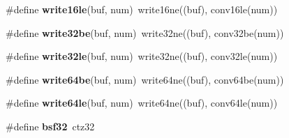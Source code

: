 \begin{DoxyCompactItemize}
\item 
\#define {\bfseries write16le}(buf, num)~write16ne((buf), conv16le(num))\label{tuklib__integer_8h_af0b9424360d88d83fe8161d5e210b4b2}

\item 
\#define {\bfseries write32be}(buf, num)~write32ne((buf), conv32be(num))\label{tuklib__integer_8h_af4f4e88616e71eb539a9dd7589475fa1}

\item 
\#define {\bfseries write32le}(buf, num)~write32ne((buf), conv32le(num))\label{tuklib__integer_8h_af29be033fcc28c5c2b11a7f580761e79}

\item 
\#define {\bfseries write64be}(buf, num)~write64ne((buf), conv64be(num))\label{tuklib__integer_8h_ab6fb0927aa9e804d9200ffdab0c23b40}

\item 
\#define {\bfseries write64le}(buf, num)~write64ne((buf), conv64le(num))\label{tuklib__integer_8h_a097c6c866bd97162c7f01eb73433a068}

\item 
\#define {\bfseries bsf32}~ctz32\label{tuklib__integer_8h_a510e889b2b5726d0e44c11b88cfc80bf}

\end{DoxyCompactItemize}
